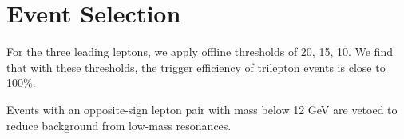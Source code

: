 \section{Event Selection}
\label{sec:Selection}

For the three leading leptons, we apply offline thresholds of 20, 15, 10\GeV. We find that with these thresholds, the trigger efficiency of trilepton events is close to 100\%.

Events with an opposite-sign lepton pair with mass below 12 GeV are vetoed to reduce background from low-mass resonances.
